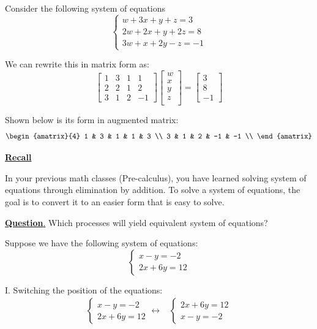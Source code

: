 \begin{example}
Consider the following system of equations
$$\begin{cases}
    w + 3x + y + z = 3 \\
    2w + 2x + y + 2z = 8 \\
    3w + x + 2y - z = -1
\end{cases}$$
\end{example}

We can rewrite this in matrix form as:
$$\left[ 
\begin{matrix}
1 & 3 & 1 & 1 \\
2 & 2 & 1 & 2 \\
3 & 1 & 2 & -1
\end{matrix}
\right]
\left[
\begin{matrix}
w \\
x \\
y \\
z \\
\end{matrix}
\right] = 
\left[
\begin{matrix}
3 \\
8 \\
-1
\end{matrix}
\right]
$$

Shown below is its form in augmented matrix:
$$
\begin{amatrix}{4}
1 & 3 & 1 & 1 & 3 \\
3 & 1 & 2 & -1 & -1 \\
\end{amatrix}$$

\newpage
\underline{\textbf{Recall}}

In your previous math classes (Pre-calculus), you have learned solving system of equations through elimination by addition. To solve a system of equations, the goal is to convert it to an easier form that is easy to solve.

\underline{\textbf{Question}.} Which processes will yield equivalent system of equations?

Suppose we have the following system of equations:
$$\begin{cases}
    x - y = -2 \\
    2x + 6y = 12
\end{cases}$$

I. Switching the position of the equations:
\begin{align*}
\begin{cases}
    x - y = -2 \\
    2x + 6y = 12
\end{cases} \longleftrightarrow\,\,\,\,\,
\begin{cases}
    2x + 6y = 12 \\
    x - y = -2
\end{cases}
\end{align*}

